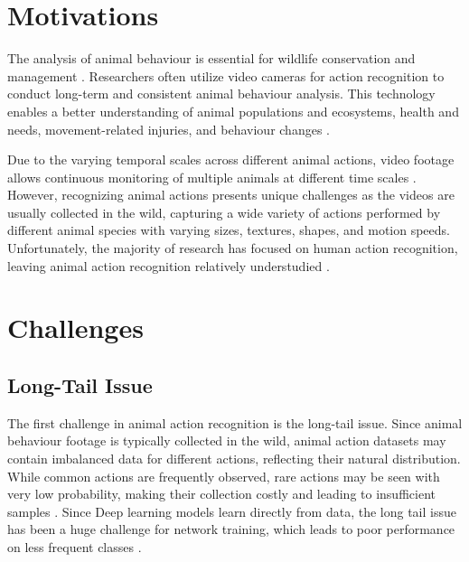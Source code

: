 \section{Motivations}
The analysis of animal behaviour is essential for wildlife conservation and management \parencite{Greggor2019, singh2020animal}. Researchers often utilize video cameras for action recognition to conduct long-term and consistent animal behaviour analysis. This technology enables a better understanding of animal populations and ecosystems, health and needs, movement-related injuries, and behaviour changes \parencite{ng2022animal, Giersberg:2022aa, 8259762}.

Due to the varying temporal scales across different animal actions, video footage allows continuous monitoring of multiple animals at different time scales \parencite{ANDERSON201418}. However, recognizing animal actions presents unique challenges as the videos are usually collected in the wild, capturing a wide variety of actions performed by different animal species with varying sizes, textures, shapes, and motion speeds. Unfortunately, the majority of research has focused on human action recognition, leaving animal action recognition relatively understudied \parencite{mondal2023msqnet}.

\section{Challenges}
\subsection{Long-Tail Issue}
The first challenge in animal action recognition is the long-tail issue. Since animal behaviour footage is typically collected in the wild, animal action datasets may contain imbalanced data for different actions, reflecting their natural distribution. While 
common actions are frequently observed, rare actions may be seen with very low probability, making their collection costly and leading to insufficient samples \parencite{ng2022animal, perrett2023use}. Since Deep learning models learn directly from data, the long tail issue has been a huge challenge for network training, which leads to poor performance on less frequent classes \parencite{cao2019learning, zhang2021videolt}.

